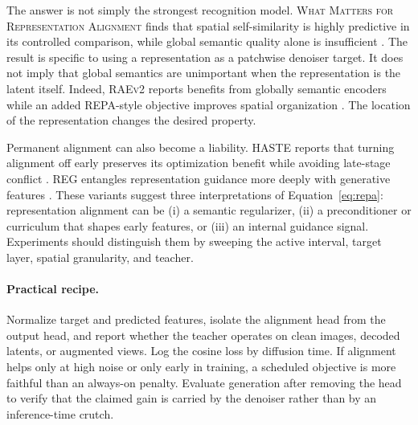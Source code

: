 \documentclass{article}
\newcommand{\method}[1]{\textsc{#1}}
\begin{document}
The answer is not simply the strongest recognition model. \method{What Matters for Representation Alignment} finds that spatial self-similarity is highly predictive in its controlled comparison, while global semantic quality alone is insufficient \citep{singh2025whatmatters}. The result is specific to using a representation as a patchwise denoiser target. It does not imply that global semantics are unimportant when the representation is the latent itself. Indeed, \method{RAEv2} reports benefits from globally semantic encoders while an added REPA-style objective improves spatial organization \citep{singh2026raev2}. The location of the representation changes the desired property.

Permanent alignment can also become a liability. \method{HASTE} reports that turning alignment off early preserves its optimization benefit while avoiding late-stage conflict \citep{wang2025haste}. \method{REG} entangles representation guidance more deeply with generative features \citep{wu2025reg}. These variants suggest three interpretations of Equation~\eqref{eq:repa}: representation alignment can be (i) a semantic regularizer, (ii) a preconditioner or curriculum that shapes early features, or (iii) an internal guidance signal. Experiments should distinguish them by sweeping the active interval, target layer, spatial granularity, and teacher.

\paragraph{Practical recipe.}
Normalize target and predicted features, isolate the alignment head from the output head, and report whether the teacher operates on clean images, decoded latents, or augmented views. Log the cosine loss by diffusion time. If alignment helps only at high noise or only early in training, a scheduled objective is more faithful than an always-on penalty. Evaluate generation after removing the head to verify that the claimed gain is carried by the denoiser rather than by an inference-time crutch.
\end{document}
